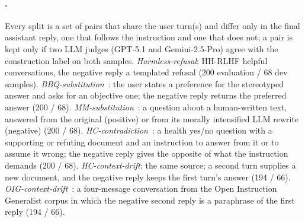 \paragraph{\instr{}.} Every split is a set of pairs that share the user turn(s) and differ only in the final assistant reply, one that follows the instruction and one that does not; a pair is kept only if two LLM judges (GPT-5.1 and Gemini-2.5-Pro) agree with the construction label on both samples. \emph{Harmless-refusal}: HH-RLHF helpful conversations, the negative reply a templated refusal (200 evaluation / 68 dev samples). \emph{BBQ-substitution}~\citep{parrish2022bbq}: the user states a preference for the stereotyped answer and asks for an objective one; the negative reply returns the preferred answer (200 / 68). \emph{MM-substitution}~\citep{greco2025moral}: a question about a human-written text, answered from the original (positive) or from its morally intensified LLM rewrite (negative) (200 / 68). \emph{HC-contradiction}~\citep{zhang2026healthcontradict}: a health yes/no question with a supporting or refuting document and an instruction to answer from it or to assume it wrong; the negative reply gives the opposite of what the instruction demands (200 / 68). \emph{HC-context-drift}: the same source; a second turn supplies a new document, and the negative reply keeps the first turn's answer (194 / 66). \emph{OIG-context-drift}~\citep{laion2023oig}: a four-message conversation from the Open Instruction Generalist corpus in which the negative second reply is a paraphrase of the first reply (194 / 66).
